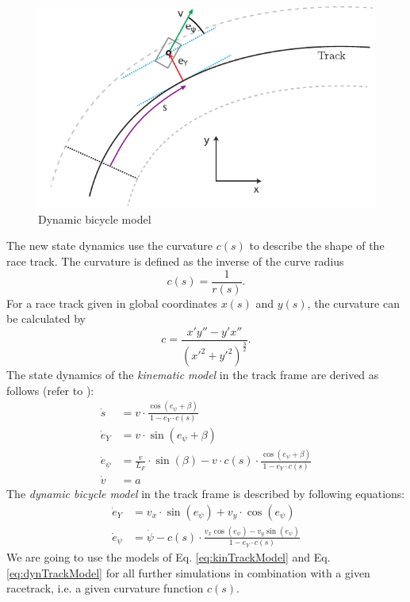 \begin{figure}[ht]
	\centering
  	\includegraphics{../../Figures/Models/s_ey.pdf}
	\caption{Dynamic bicycle model}
	\label{fig:s_ey}
\end{figure}
The new state dynamics use the curvature $c(s)$ to describe the shape of the race track. The curvature is defined as the inverse of the curve radius
\begin{equation}
c(s) = \frac{1}{r(s)}.
\end{equation}
For a race track given in global coordinates $x(s)$ and $y(s)$, the curvature can be calculated by
\begin{equation}
c = \frac{x'y''-y'x''}{(x'^2+y'^2)^\frac{3}{2}}.
\end{equation}
The state dynamics of the \emph{kinematic model} in the track frame are derived as follows (refer to \cite{rajamani2005vehicle}):
\begin{subequations}\label{eq:kinTrackModel}
\begin{align}
    \dot s &= v\cdot \frac{\cos(e_\psi+\beta)}{1-e_Y\cdot c(s)}\\
    \dot e_Y &= v \cdot \sin(e_\psi+\beta)\\
    \dot e_\psi &= \frac{v}{L_F}\cdot \sin(\beta)-v\cdot c(s)\cdot \frac{\cos(e_\psi+\beta)}{1-e_Y\cdot c(s)}\\
    \dot v &= a
\end{align}
\end{subequations}
The \emph{dynamic bicycle model} in the track frame is described by following equations:
\begin{subequations}\label{eq:dynTrackModel}
\begin{align}
    \dot e_Y &= v_x\cdot \sin(e_\psi) + v_y\cdot \cos(e_\psi)\\
    \dot e_\psi &= \dot\psi - c(s)\cdot\frac{v_x\cos(e_\psi)-v_y\sin(e_\psi)}{1-e_Y\cdot c(s)}
\end{align}
\end{subequations}
We are going to use the models of Eq. \eqref{eq:kinTrackModel} and Eq. \eqref{eq:dynTrackModel} for all further simulations in combination with a given racetrack, i.e. a given curvature function $c(s)$.
